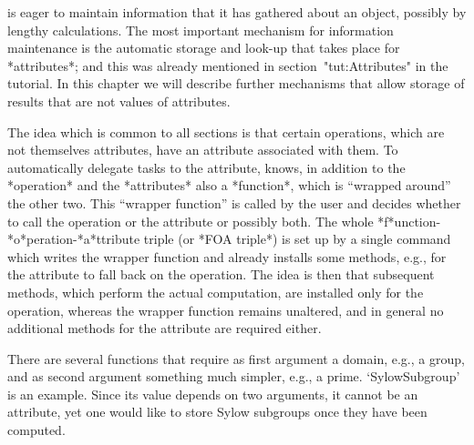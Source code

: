 
{\GAP}  is eager  to maintain information  that  it has gathered about an
object, possibly by lengthy  calculations. The most  important mechanism
for information maintenance  is the  automatic  storage and look-up  that
takes  place  for  *attributes*; and    this   was already mentioned   in
section~"tut:Attributes"  in the   tutorial. In   this  chapter  we  will
describe further mechanisms that  allow storage of  results that  are not
values of attributes.

The  idea which is   common to all  sections  is that certain operations,
which are  not themselves attributes, have  an attribute  associated with
them. To automatically delegate tasks to the  attribute, {\GAP} knows, in
addition  to  the *operation*  and  the  *attributes*   also a
*function*, which  is  ``wrapped around'' the  other  two. This ``wrapper
function''  is called by    the user and    decides whether to  call  the
operation    or  the    attribute     or  possibly     both.   The  whole
*f*unction-*o*peration-*a*ttribute triple (or *FOA triple*)  is set up by
a single   {\GAP} command which  writes the  wrapper function and already
installs  some methods,  e.g.,  for the attribute  to   fall back on  the
operation. The idea  is then that subsequent  methods, which  perform the
actual computation, are installed   only for the operation,   whereas the
wrapper function remains unaltered, and  in general no additional methods
for the attribute are required either.



There  are several functions  that  require as first  argument a domain,
e.g., a  group, and as second  argument  something much simpler,  e.g., a
prime. `SylowSubgroup'  is an  example.
Since its value depends on two arguments, it cannot be an attribute,
yet one would like to store Sylow subgroups once they have been computed.


